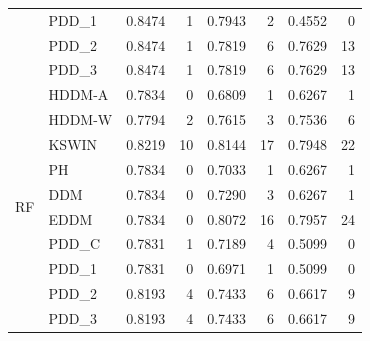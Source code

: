\begin{table}[h]
{\begin{tabular}{llcrcrcr}
         & PDD\_1 & 0.8474 & 1 & 0.7943 & 2 & 0.4552 & 0 \\
         & PDD\_2 & 0.8474 & 1 & 0.7819 & 6 & 0.7629 & 13 \\
         & PDD\_3 & 0.8474 & 1 & 0.7819 & 6 & 0.7629 & 13 \\ \midrule
        \multirow{10}{*}{RF} & HDDM-A & 0.7834 & 0 & 0.6809 & 1 & 0.6267 & 1 \\
         & HDDM-W & 0.7794 & 2 & 0.7615 & 3 & 0.7536 & 6 \\
         & KSWIN & 0.8219 & 10 & 0.8144 & 17 & 0.7948 & 22 \\
         & PH & 0.7834 & 0 & 0.7033 & 1 & 0.6267 & 1 \\
         & DDM & 0.7834 & 0 & 0.7290 & 3 & 0.6267 & 1 \\
         & EDDM & 0.7834 & 0 & 0.8072 & 16 & 0.7957 & 24 \\
         & PDD\_C & 0.7831 & 1 & 0.7189 & 4 & 0.5099 & 0 \\
         & PDD\_1 & 0.7831 & 0 & 0.6971 & 1 & 0.5099 & 0 \\
         & PDD\_2 & 0.8193 & 4 & 0.7433 & 6 & 0.6617 & 9 \\
         & PDD\_3 & 0.8193 & 4 & 0.7433 & 6 & 0.6617 & 9 \\\bottomrule
    \end{tabular}}
\end{table}
